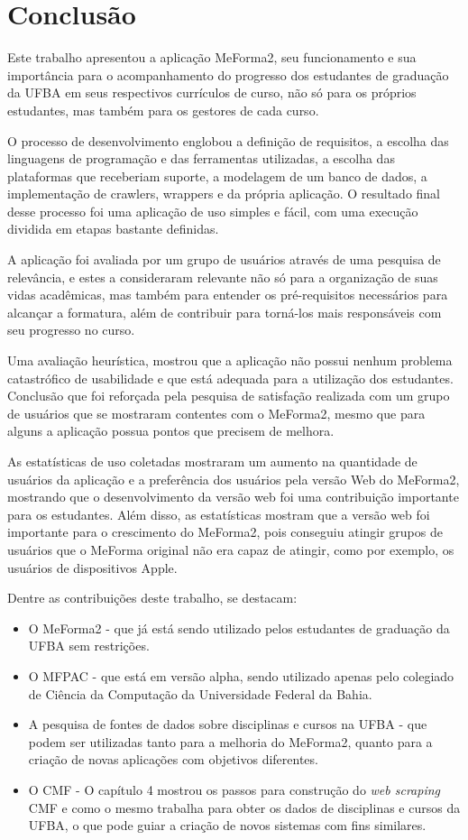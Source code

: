 \chapter{Conclusão}

Este trabalho apresentou a aplicação MeForma2, seu funcionamento e sua importância para o acompanhamento do progresso dos estudantes de graduação da UFBA em seus respectivos currículos de curso, não só para os próprios estudantes, mas também para os gestores de cada curso.

O processo de desenvolvimento englobou a definição de requisitos, a escolha das linguagens de programação e das ferramentas utilizadas, a escolha das plataformas que receberiam suporte, a modelagem de um banco de dados, a implementação de crawlers, wrappers e da própria aplicação. O resultado final desse processo foi uma aplicação de uso simples e fácil, com uma execução dividida em etapas bastante definidas.

A aplicação foi avaliada por um grupo de usuários através de uma pesquisa de relevância, e estes a consideraram relevante não só para a organização de suas vidas acadêmicas, mas também para entender os pré-requisitos necessários para alcançar a formatura, além de contribuir para torná-los mais responsáveis com seu progresso no curso.

Uma avaliação heurística, mostrou que a aplicação não possui nenhum problema catastrófico de usabilidade e que está adequada para a utilização dos estudantes. Conclusão que foi reforçada pela pesquisa de satisfação realizada com um grupo de usuários que se mostraram contentes com o MeForma2, mesmo que para alguns a aplicação possua pontos que precisem de melhora.

As estatísticas de uso coletadas mostraram um aumento na quantidade de usuários da aplicação e a preferência dos usuários pela versão Web do MeForma2, mostrando que o desenvolvimento da versão web foi uma contribuição importante para os estudantes. Além disso, as estatísticas mostram que a versão web foi importante para o crescimento do MeForma2, pois conseguiu atingir grupos de usuários que o MeForma original não era capaz de atingir, como por exemplo, os usuários de dispositivos Apple.

Dentre as contribuições deste trabalho, se destacam:
\begin{itemize}
    \item O MeForma2 - que já está sendo utilizado pelos estudantes de graduação da UFBA sem restrições.
    \item O MFPAC - que está em versão alpha, sendo utilizado apenas pelo colegiado de Ciência da Computação da Universidade Federal da Bahia.
    \item A pesquisa de fontes de dados sobre disciplinas e cursos na UFBA - que podem ser utilizadas tanto para a melhoria do MeForma2, quanto para a criação de novas aplicações com objetivos diferentes.
    \item O CMF - O capítulo 4 mostrou os passos para construção do \textit{web scraping} CMF e como o mesmo trabalha para obter os dados de disciplinas e cursos da UFBA, o que pode guiar a criação de novos sistemas com fins similares.
\end{itemize}

